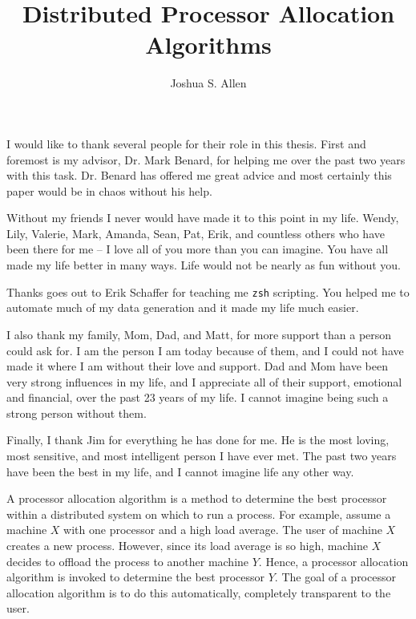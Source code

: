 \documentclass{report}
\title{Distributed Processor Allocation Algorithms}
\author{Joshua S. Allen}
\begin{document}


\frontpart                   %
\titlepg                     %
\acknowledgement             %

I would like to thank several people for their role in this thesis.  First
and foremost is my advisor, Dr. Mark Benard, for helping me over the past
two years with this task.  Dr. Benard has offered me great advice and most
certainly this paper would be in chaos without his help.

Without my friends I never would have made it to this point in my life.
Wendy, Lily, Valerie, Mark, Amanda, Sean, Pat, Erik, and countless others
who have been there for me -- I love all of you more than you can imagine.
You have all made my life better in many ways.  Life would not be nearly as
fun without you.

Thanks goes out to Erik Schaffer for teaching me \texttt{zsh} scripting.
You helped me to automate much of my data generation and it made my life
much easier.

I also thank my family, Mom, Dad, and Matt, for more support than a person
could ask for.  I am the person I am today because of them, and I could not
have made it where I am without their love and support.  Dad and Mom have
been very strong influences in my life, and I appreciate all of their
support, emotional and financial, over the past 23 years of my life.  I
cannot imagine being such a strong person without them.

Finally, I thank Jim for everything he has done for me.  He is the most
loving, most sensitive, and most intelligent person I have ever met.  The
past two years have been the best in my life, and I cannot imagine life
any other way.




\abstract

A processor allocation algorithm is a method to determine the best processor
within a distributed system on which to run a process.  For example, assume
a machine $X$ with one processor and a high load average.  The user of
machine $X$ creates a new process.  However, since its load average is so
high, machine $X$ decides to offload the process to another machine $Y$.
Hence, a processor allocation algorithm is invoked to determine the best
processor $Y$.  The goal of a processor allocation algorithm is to do this
automatically, completely transparent to the user.
\end{document}
